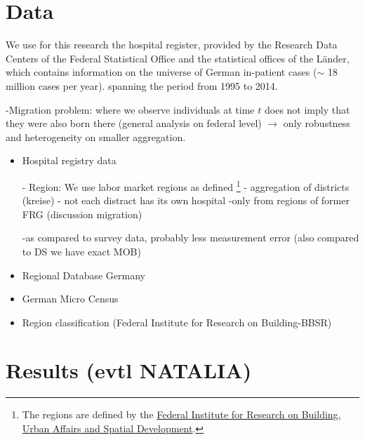 \documentclass[11pt, a4paper,draft]{article} %
\begin{document}
\section{Data}\label{sec:data}

We use for this research the hospital register, provided by the Research Data Centers of the Federal Statistical Office and the statistical offices of the Länder, which contains information on the universe of German in-patient cases ($\sim$ 18 million cases per year).%
 spanning the period from 1995 to 2014.

-Migration problem: where we observe individuals at time $t$ does not imply that they were also born there (general analysis on federal level) $\rightarrow$ only robustness and heterogeneity on smaller aggregation.

\begin{itemize}
	\item Hospital registry data
	
	- Region: We use labor market regions as defined  \footnote{The regions are defined by the \href{https://www.bbsr.bund.de/BBSR/DE/Raumbeobachtung/Raumabgrenzungen/AMR/amr_node.html}{Federal Institute for Research on Building, Urban Affairs and Spatial Development}.}
		- aggregation of districts (kreise)
		- not each distract has its own hospital 
	-only from regions of former FRG (discussion migration)

	-as compared to survey data, probably less measurement error (also compared to DS we have exact MOB)
	
	\item Regional Database Germany
	\item German Micro Census
	\item Region classification (Federal Institute for Research on Building-BBSR)
\end{itemize}
\section{Results (evtl NATALIA)}\label{sec:results}
\end{document}
